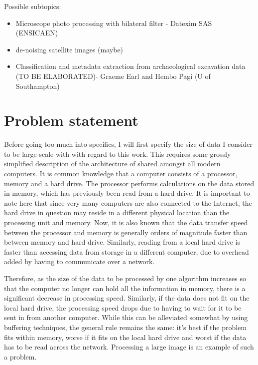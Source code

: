 \documentclass [12pt,a4paper]{report}
\begin{document}

Possible subtopics:
\begin{itemize}
	\item Microscope photo processing with bilateral filter - Datexim SAS (ENSICAEN)
	\item de-noising satellite images (maybe)
	\item Classification and metadata extraction from archaeological excavation data (TO BE ELABORATED)- Graeme Earl and Hembo Pagi (U of Southampton)
	
\end{itemize}

\section{Problem statement}

Before going too much into specifics, I will first specify the size of data I consider to be large-scale with with regard to this work. This requires some grossly simplified description of the architecture of shared amongst all modern computers. It is common knowledge that a computer consists of a processor, memory and a hard drive. The processor performs calculations on the data stored in memory, which has previously been read from a hard drive. It is important to note here that since very many computers are also connected to the Internet, the hard drive in question may reside in a different physical location than the processing unit and memory. Now, it is also known that the data transfer speed between the processor and memory is generally orders of magnitude faster than between memory and hard drive. Similarly, reading from a local hard drive is faster than accessing data from storage in a different computer, due to overhead added by having to communicate over a network.

Therefore, as the size of the data to be processed by one algorithm increases so that the computer no longer can hold all the information in memory, there is a significant decrease in processing speed. Similarly, if the data does not fit on the local hard drive, the processing speed drops due to having to wait for it to be sent in from another computer. While this can be alleviated somewhat by using buffering techniques, the general rule remains the same: it's best if the problem fits within memory, worse if it fits on the local hard drive and worst if the data has to be read across the network. Processing a large image is an example of such a problem.
\end{document}
